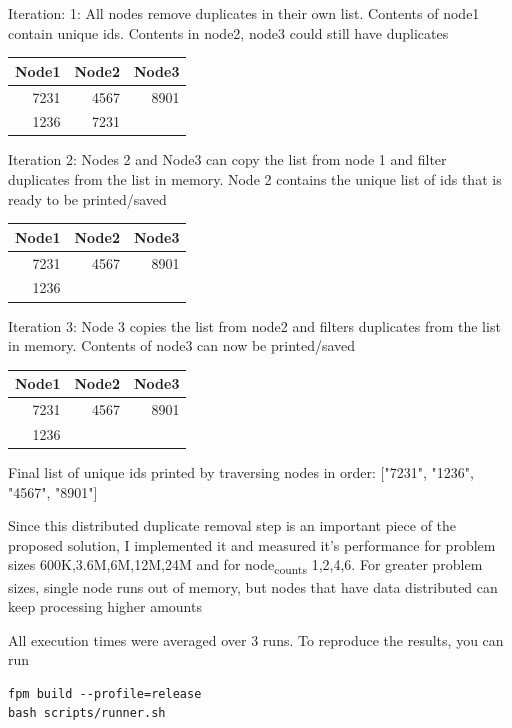 \documentclass[11pt]{article}
\begin{document}
Iteration: 1: All nodes remove duplicates in their own list. Contents
of node1 contain unique ids. Contents in node2,
node3 could still have duplicates
\begin{center}
\begin{tabular}{rrr}
Node1 & Node2 & Node3\\
\hline
7231 & 4567 & 8901\\
1236 & 7231 & \\
\end{tabular}
\end{center}

Iteration 2: Nodes 2 and Node3 can copy the list from node 1 and
filter duplicates from the list in memory. Node 2 contains the
unique list of ids that is ready to be printed/saved
\begin{center}
\begin{tabular}{rrr}
Node1 & Node2 & Node3\\
\hline
7231 & 4567 & 8901\\
1236 &  & \\
\end{tabular}
\end{center}
Iteration 3: Node 3 copies the list from node2 and filters duplicates
from the list in memory. Contents of node3 can now be printed/saved
\begin{center}
\begin{tabular}{rrr}
Node1 & Node2 & Node3\\
\hline
7231 & 4567 & 8901\\
1236 &  & \\
\end{tabular}
\end{center}

Final list of unique ids printed by traversing nodes in order:
["7231", "1236", "4567", "8901"]

Since this distributed duplicate removal step is an important piece of
the proposed solution, I implemented it and measured it's performance
for problem sizes 600K,3.6M,6M,12M,24M and for node\textsubscript{counts}
1,2,4,6. For greater problem sizes, single node runs out of memory,
but nodes that have data distributed can keep processing higher amounts

All execution times were averaged over 3 runs. To reproduce the
results, you can run
\begin{verbatim}
fpm build --profile=release
bash scripts/runner.sh
\end{verbatim}
\end{document}
